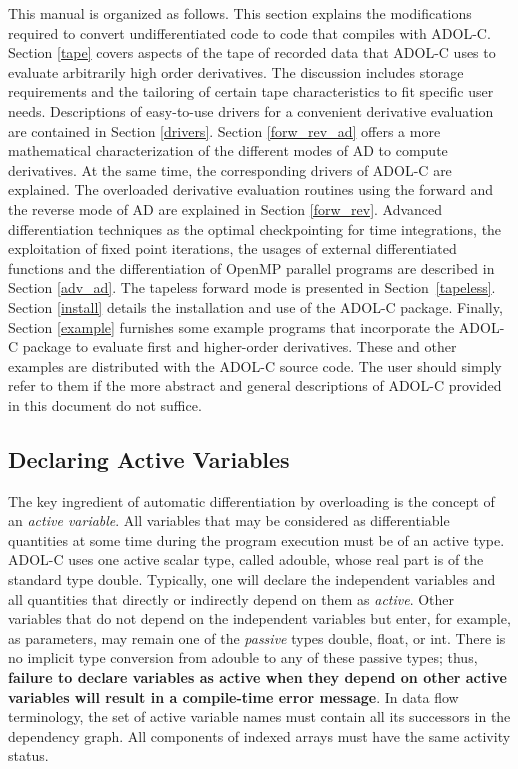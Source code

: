 \documentclass[11pt,twoside]{article}
\begin{document}
This manual is organized as follows. This section explains the 
modifications required to convert undifferentiated code to code that 
compiles with ADOL-C. 
Section \ref{tape} covers aspects of the tape of recorded data that ADOL-C uses to
evaluate arbitrarily high order derivatives. The discussion includes storage 
requirements and the tailoring of certain tape characteristics to fit specific
user needs. Descriptions of easy-to-use drivers for a  convenient derivative 
evaluation are contained in Section \ref{drivers}. 
 Section \ref{forw_rev_ad} offers a more mathematical characterization of
the different modes of AD to compute derivatives. At the same time, the
corresponding drivers of ADOL-C are explained.  
The overloaded derivative evaluation routines using the forward and the reverse
mode of AD are explained in Section \ref{forw_rev}. 
Advanced differentiation techniques as the optimal checkpointing for
time integrations, the exploitation of fixed point iterations, the usages
of external differentiated functions and the differentiation of OpenMP
parallel programs are described in Section \ref{adv_ad}. 
The tapeless forward mode is presented in Section~\ref{tapeless}.
Section \ref{install} details the installation and 
use of the ADOL-C package. Finally, Section \ref{example} 
furnishes some example programs that incorporate the ADOL-C package to 
evaluate first and higher-order
derivatives.  These and other examples are distributed with the ADOL-C
source code.
The user should simply refer to them if the more abstract and general 
descriptions of ADOL-C provided in this document do not suffice.
%
\subsection{Declaring Active Variables}
%
\label{DecActVar}
%
The key ingredient of automatic differentiation by overloading is the
concept of an {\em active variable}. All variables that may be
considered as differentiable quantities at some time
during the program execution must be of an active
type. ADOL-C uses one 
active scalar type, called {\sf adouble}, whose real part is of the
standard type {\sf double}. 
Typically, one will declare the independent variables
and all quantities that directly or indirectly depend on them as 
{\em active}. Other variables that do not depend on the independent
variables but enter, for example, as parameters, may remain one of the
{\em passive} types {\sf double, float}, or {\sf int}. There is no
implicit type conversion from {\sf adouble} to any of these passive
types; thus, {\bf failure to declare variables as active when they
depend on other active variables will result in a compile-time error
message}. In data flow terminology, the set of active variable names
must contain all its successors in the dependency graph. All components
of indexed arrays must have the same activity status.
\end{document}
